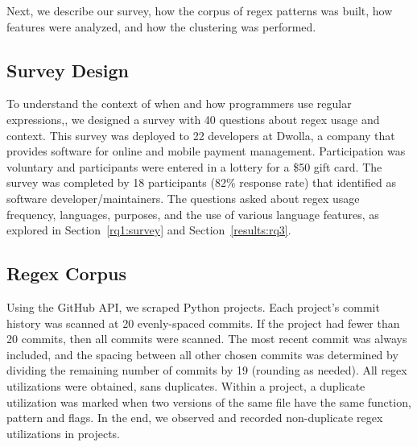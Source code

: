 Next, we describe our survey, how the corpus of regex patterns was built, how features were analyzed, and how the clustering was performed.

\subsection{Survey Design}
\label{study:survey}
To understand the context of when and how programmers use regular expressions,,
we designed a survey with 40 questions about regex usage and context.
This survey was deployed to 22 developers at Dwolla, a company that provides software for
 online and mobile payment management.
Participation was voluntary and participants were entered in a lottery for a \$50 gift card.
The survey was completed by 18 participants (82\% response rate) that identified as software developer/maintainers. The questions asked about regex usage frequency, languages, purposes, and the use of various language features, as explored in Section~\ref{rq1:survey} and Section~\ref{results:rq3}.


\subsection{Regex Corpus}
\label{study:corpus}
Using the GitHub API, we scraped  Python projects.  Each project's commit history was scanned at 20 evenly-spaced commits.  If the project had fewer than 20 commits, then all commits were scanned.  The most recent commit was always included, and the spacing between all other chosen commits was determined by dividing the remaining number of commits by 19 (rounding as needed).
All regex utilizations were obtained, sans duplicates. Within a project, a duplicate utilization was marked when two versions of the same file have the same function, pattern and flags.  In the end, we observed and recorded  non-duplicate regex utilizations in  projects.

